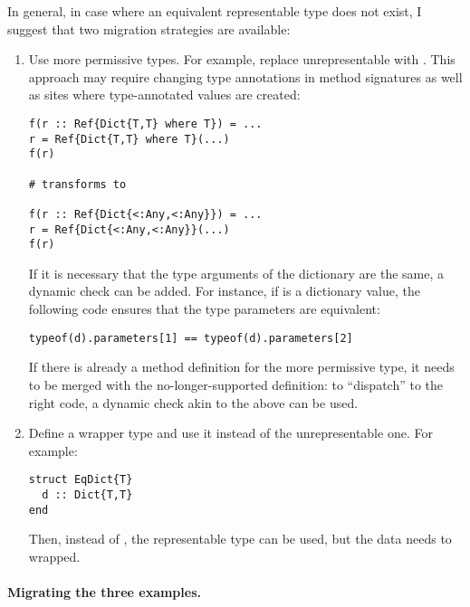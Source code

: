 In general, in case where an equivalent representable type does not exist,
I suggest that two migration strategies are available:
\begin{enumerate}
  \item Use more permissive types. For example, replace unrepresentable
     with .
    This approach may require changing type annotations in method signatures as
    well as sites where type-annotated values are created:
    \begin{codeenvd}
    \begin{lstlisting}
f(r :: Ref{Dict{T,T} where T}) = ...
r = Ref{Dict{T,T} where T}(...)
f(r)

# transforms to

f(r :: Ref{Dict{<:Any,<:Any}}) = ...
r = Ref{Dict{<:Any,<:Any}}(...)
f(r)
    \end{lstlisting}
    \end{codeenvd}
    If it is necessary that the type arguments of the dictionary are the same,
    a dynamic check can be added. For instance, if  is a dictionary
    value, the following code ensures that the type parameters are
    equivalent:
    \begin{codeenvd}
    \begin{lstlisting}
typeof(d).parameters[1] == typeof(d).parameters[2]
    \end{lstlisting}
    \end{codeenvd}
    If there is already a method definition for the more permissive type,
    it needs to be merged with the no-longer-supported definition:
    to ``dispatch'' to the right code, a dynamic check akin to the above
    can be used.
  \item Define a wrapper type and use it instead of the unrepresentable one.
    For example:
    \begin{codeenvd}
    \begin{lstlisting}
struct EqDict{T}
  d :: Dict{T,T}
end
    \end{lstlisting}
    \end{codeenvd}
    Then, instead of , the representable type
     can be used, but the data needs to wrapped.
\end{enumerate}

\paragraph{Migrating the three examples.}

